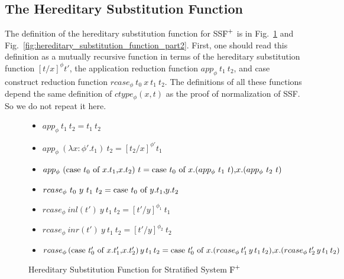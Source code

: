 \subsection{The Hereditary Substitution Function}
\label{sec:the_hereditary_substitution_function_ssfp}

The definition of the hereditary substitution function for SS$\mbox{F}^{+}$ is
in Fig.~\ref{fig:hereditary_substitution_function_part1} and
Fig.~\ref{fig:hereditary_substitution_function_part2}.  First, one
should read this definition as a mutually recursive function in terms
of the hereditary substitution function $[t/x]^\phi t'$,
the application reduction function $app_\phi\ t_1\ t_2$, and 
case construct reduction function $rcase_\phi\ t_0\ x\ t_1\ t_2$.  The
definitions of all these functions depend the same definition of 
$ctype_\phi(x, t)$ as the proof of normalization of SSF.  So we do not
repeat it here.
\begin{figure} 
  \small
  \begin{itemize}
  \item[] $app_\phi\ t_1\ t_2 = t_1\ t_2$
    
  \item[] $app_\phi\ (\lambda x:\phi'.t_1)\ t_2 = [t_2/x]^{\phi'} t_1$
  \item[] $app_\phi\ (\ccon{t_0}{x}{t_1}{t_2})\ t = 
    \ccon{t_0}{x}{(app_\phi\ t_1\ t)}{(app_\phi\ t_2\ t)}$
  \end{itemize}
  
  \begin{itemize}
  \item[] $rcase_{\phi}\ t_0\ y\ t_1\ t_2 = \mbox{case}\ t_0\ \text{of}\ y\text{.}t_1\text{,}y\text{.}t_2$
  \item[] $rcase_{\phi}\ inl(t')\ y\ t_1\ t_2 = [t'/y]^{\phi_1}\ t_1$
  \item[] $rcase_{\phi}\ inr(t')\ y\ t_1\ t_2 = [t'/y]^{\phi_2}\ t_2$
  \item[] $rcase_{\phi}\,(\mbox{case}\ t'_0\ \text{of}\ x\text{.}t'_1\text{,}x\text{.}t'_2)\,y\,t_1\,t_2 = 
    \mbox{case}\ t'_0\ \text{of}\ x\text{.}(rcase_{\phi}\,t'_1\,y\,t_1\,t_2)\text{,}x\text{.}(rcase_{\phi}\,t'_2\,y\,t_1\,t_2)$
  \end{itemize}
  \caption{Hereditary Substitution Function for Stratified System $\mbox{F}^{+}$}
  \label{fig:hereditary_substitution_function_part1}
\end{figure}

